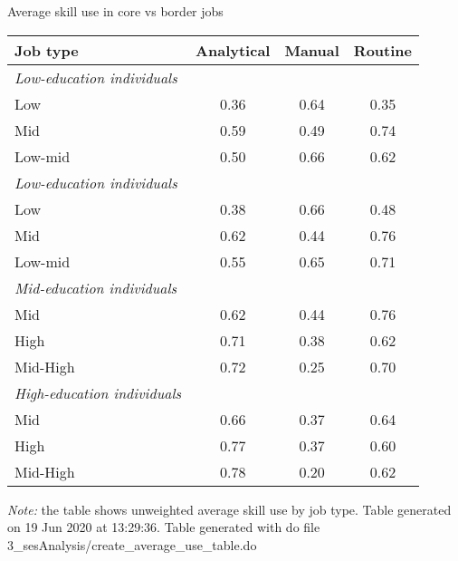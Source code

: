\begin{center}
\begin{threeparttable}[!h]
\caption{Average skill use in core vs border jobs}
\begin{tabular}{lccc}
\toprule
\toprule
\textbf{Job type}&\multicolumn{1}{c}{\textbf{Analytical}}&\multicolumn{1}{c}{\textbf{Manual}}&\multicolumn{1}{c}{\textbf{Routine}} \\
\midrule
\textit{Low-education individuals} \\
\hline
\hspace{3mm}Low&0.36&0.64&0.35 \\
\hspace{3mm}Mid&0.59&0.49&0.74 \\
\hspace{3mm}Low-mid&0.50&0.66&0.62 \\
\textit{Low-education individuals} \\
\hline
\hspace{3mm}Low&0.38&0.66&0.48 \\
\hspace{3mm}Mid&0.62&0.44&0.76 \\
\hspace{3mm}Low-mid&0.55&0.65&0.71 \\
\midrule\textit{Mid-education individuals} \\
\hline
\hspace{3mm}Mid&0.62&0.44&0.76 \\
\hspace{3mm}High&0.71&0.38&0.62 \\
\hspace{3mm}Mid-High&0.72&0.25&0.70 \\
\textit{High-education individuals} \\
\hline
\hspace{3mm}Mid&0.66&0.37&0.64 \\
\hspace{3mm}High&0.77&0.37&0.60 \\
\hspace{3mm}Mid-High&0.78&0.20&0.62 \\
\bottomrule
\bottomrule
\end{tabular}
\begin{tablenotes}
\item \footnotesize \textit{Note:} the table shows unweighted average skill use by job type. Table generated on 19 Jun 2020 at 13:29:36. Table generated with do file 3\_sesAnalysis/create\_average\_use\_table.do
\end{tablenotes}
\end{threeparttable}
\end{center}
